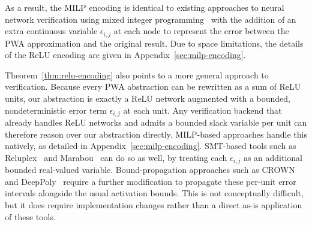 As a result, the MILP encoding is identical to existing approaches to neural network verification using mixed integer programming~\cite{tjeng_xiao_tedrake_2017,dutta_chen_jha_sriram_sankaranarayanan_tiwari_2019,lomuscio_maganti_2017} with the addition of an extra continuous variable $\epsilon_{i,j}$ at each node to represent the error between the PWA approximation and the original result.  
Due to space limitations, the details of the ReLU encoding are given in Appendix~\ref{sec:milp-encoding}.

Theorem~\ref{thm:relu-encoding} also points to a more general approach to verification. Because every PWA abstraction can be rewritten as a sum of ReLU units, our abstraction is exactly a ReLU network augmented with a bounded, nondeterministic error term $\epsilon_{i,j}$ at each unit. Any verification backend that already handles ReLU networks and admits a bounded slack variable per unit can therefore reason over our abstraction directly. MILP-based approaches handle this natively, as detailed in Appendix~\ref{sec:milp-encoding}. SMT-based tools such as Reluplex~\cite{katz_barrett_dill_julian_kochenderfer_2017} and Marabou~\cite{katz_huang_2019} can do so as well, by treating each $\epsilon_{i,j}$ as an additional bounded real-valued variable. Bound-propagation approaches such as CROWN~\cite{zhang_weng_chen_hsieh_daniel_2018} and DeepPoly~\cite{Singh+Others/2019/Beyond} require a further modification to propagate these per-unit error intervals alongside the usual activation bounds. This is not conceptually difficult, but it does require implementation changes rather than a direct as-is application of these tools.


